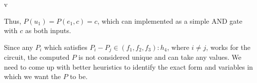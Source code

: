 v\documentclass{article}
\begin{document}
Thus, $P(u_1)=P(e_1,c)=c$, which can implemented as a simple AND gate with $c$ as both inputs. 

Since any $P_i$ which satisfies $P_i-P_j\in(f_1,f_2,f_3):h_4$, where $i\neq j$, works for the circuit, the computed $P$ is not considered unique and can take any values. We need to come up with better heuristics to identify the exact form and variables in which we want the $P$ to be. 



\end{document}
